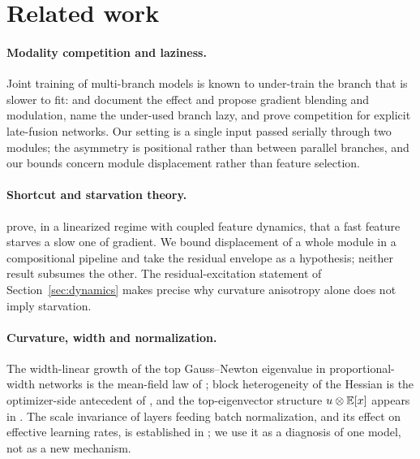 \section{Related work}
\label{sec:related}

\paragraph{Modality competition and laziness.}
Joint training of multi-branch models is known to under-train the branch
that is slower to fit: \citet{wang2020what} and \citet{peng2022balanced}
document the effect and propose gradient blending and modulation,
\citet{du2023unimodal} name the under-used branch lazy, and
\citet{huang2022modality} prove competition for explicit late-fusion
networks. Our setting is a single input passed serially through two modules;
the asymmetry is positional rather than between parallel branches, and our
bounds concern module displacement rather than feature selection.

\paragraph{Shortcut and starvation theory.}
\citet{pezeshki2021gradient} prove, in a linearized regime with coupled
feature dynamics, that a fast feature starves a slow one of gradient. We
bound displacement of a whole module in a compositional pipeline and take
the residual envelope as a hypothesis; neither result subsumes the other. The
residual-excitation statement of Section~\ref{sec:dynamics} makes precise
why curvature anisotropy alone does not imply starvation.

\paragraph{Curvature, width and normalization.}
The width-linear growth of the top Gauss--Newton eigenvalue in
proportional-width networks is the mean-field law of
\citet{karakida2019universal}; block heterogeneity of the Hessian is the
optimizer-side antecedent of \citet{zhang2024adam}, and the top-eigenvector
structure $u\otimes\mathbb{E}[x]$ appears in \citet{papyan2020prevalence}. The
scale invariance of layers feeding batch normalization, and its effect on
effective learning rates, is established in \citet{vanlaarhoven2017l2}; we
use it as a diagnosis of one model, not as a new mechanism.

